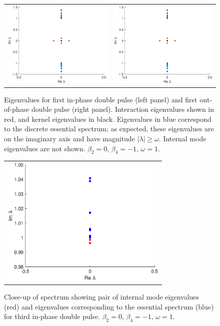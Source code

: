 \documentclass[12pt]{article}
\begin{document}
\begin{figure}[H]
\centering
\begin{tabular}{cc}
\includegraphics[width=8cm]{images/inteigsDP1plus.eps} &
\includegraphics[width=8cm]{images/inteigsDP1plus.eps}
\end{tabular}
\caption{Eigenvalues for first in-phase double pulse (left panel) and first out-of-phase double pulse (right panel). Interaction eigenvalues shown in red, and kernel eigenvalues in black. Eigenvalues in blue correspond to the discrete essential spectrum; as expected, these eigenvalues are on the imaginary axis and have magnitude $|\lambda| \geq \omega$. Internal mode eigenvalues are not shown. $\beta_2 = 0$, $\beta_4 = -1$, $\omega = 1$.}
\label{fig:doublespec}
\end{figure} 

\begin{figure}[H]
\centering
\begin{tabular}{c}
\includegraphics[width=8cm]{images/DP3internalmode.eps}
\end{tabular}
\caption{Close-up of spectrum showing pair of internal mode eigenvalues (red) and eigenvalues corresponding to the essential spectrum (blue) for third in-phase double pulse. $\beta_2 = 0$, $\beta_4 = -1$, $\omega = 1$.}
\label{fig:doubleinternalmode}
\end{figure}
\end{document}
